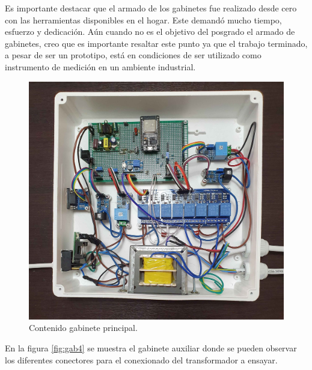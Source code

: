 Es importante destacar que el armado de los gabinetes fue realizado desde cero con las herramientas disponibles en el hogar. Este demandó mucho tiempo, esfuerzo y dedicación. Aún cuando no es el objetivo del posgrado el armado de gabinetes, creo que es importante resaltar este punto ya que el trabajo terminado, a pesar de ser un prototipo, está en condiciones de ser utilizado como instrumento de medición en un ambiente industrial.

\begin{figure}[h]
	\centering
	\includegraphics[scale=0.15]{./Figures/gab3.jpg}
	\caption{Contenido gabinete principal.}
	\label{fig:gab3}
\end{figure}

\pagebreak

En la figura \ref{fig:gab4} se muestra el gabinete auxiliar donde se pueden observar los diferentes conectores para el conexionado del transformador a ensayar.


